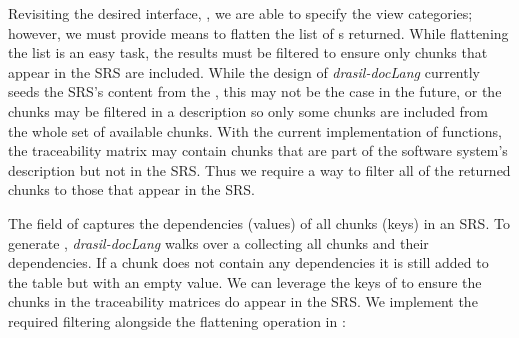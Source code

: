 %

%
%

Revisiting the desired interface, , we are able to specify the view categories; however, we must provide means to flatten the list of s returned. While flattening the list is an easy task, the results must be filtered to ensure only chunks that appear in the SRS are included. While the design of \textit{drasil-docLang} currently seeds the SRS's content from the , this may not be the case in the future, or the chunks may be filtered in a description so only some chunks are included from the whole set of available chunks. With the current implementation of  functions, the traceability matrix may contain chunks that are part of the software system's description but not in the SRS. Thus we require a way to filter all of the returned chunks to those that appear in the SRS.

The  field of  captures the dependencies (values) of all chunks (keys) in an SRS. To generate , \textit{drasil-docLang} walks over a  collecting all chunks and their dependencies. If a chunk does not contain any dependencies it is still added to the table but with an empty value. We can leverage the keys of  to ensure the chunks in the traceability matrices do appear in the SRS. We implement the required filtering alongside the flattening operation in :

